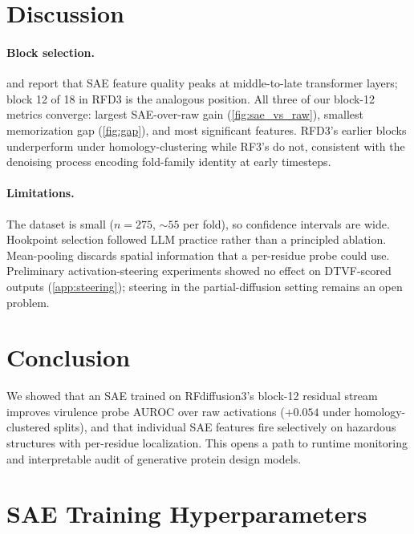 \documentclass{article}
\begin{document}
\section{Discussion}
\label{sec:discussion}

\paragraph{Block selection.}
\citet{gao2025scaling} and \citet{templeton2024scaling} report that SAE feature quality peaks at middle-to-late transformer layers; block 12 of 18 in RFD3 is the analogous position. All three of our block-12 metrics converge: largest SAE-over-raw gain (\cref{fig:sae_vs_raw}), smallest memorization gap (\cref{fig:gap}), and most significant features. RFD3's earlier blocks underperform under homology-clustering while RF3's do not, consistent with the denoising process encoding fold-family identity at early timesteps.

\paragraph{Limitations.}
The dataset is small ($n = 275$, ${\sim}55$ per fold), so confidence intervals are wide. Hookpoint selection followed LLM practice rather than a principled ablation. Mean-pooling discards spatial information that a per-residue probe could use. Preliminary activation-steering experiments showed no effect on DTVF-scored outputs (\cref{app:steering}); steering in the partial-diffusion setting remains an open problem.

\section{Conclusion}

We showed that an SAE trained on RFdiffusion3's block-12 residual stream improves virulence probe AUROC over raw activations ($+0.054$ under homology-clustered splits), and that individual SAE features fire selectively on hazardous structures with per-residue localization. This opens a path to runtime monitoring and interpretable audit of generative protein design models.





\appendix
\onecolumn

\section{SAE Training Hyperparameters}
\label{app:hparams}
\end{document}
